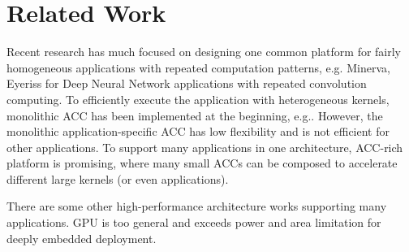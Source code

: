 \vspace{-2pt}
\section{Related Work}
\label{sec:related}


Recent research has much focused on designing one common platform for fairly homogeneous applications with repeated computation patterns, e.g. Minerva\cite{reagen2016minerva}, Eyeriss\cite{chen2018eyeriss} for Deep Neural Network applications with repeated convolution computing. 
To efficiently execute the application with heterogeneous kernels, monolithic ACC has been implemented at the beginning, e.g.\cite{tamitani1992encoder}\cite{chawla2016image}. 
However, the monolithic application-specific ACC has low flexibility and is not efficient for other applications. To support many applications in one architecture, ACC-rich platform\cite{cong2014accelerator}\cite{tabkhi2014function} is promising, where many small ACCs can be composed to accelerate different large kernels (or even applications).

There are some other high-performance architecture works supporting many applications.
GPU\cite{grasso2014energy} is too general and exceeds power and area limitation for deeply embedded deployment\cite{maghazeh2013general}.





